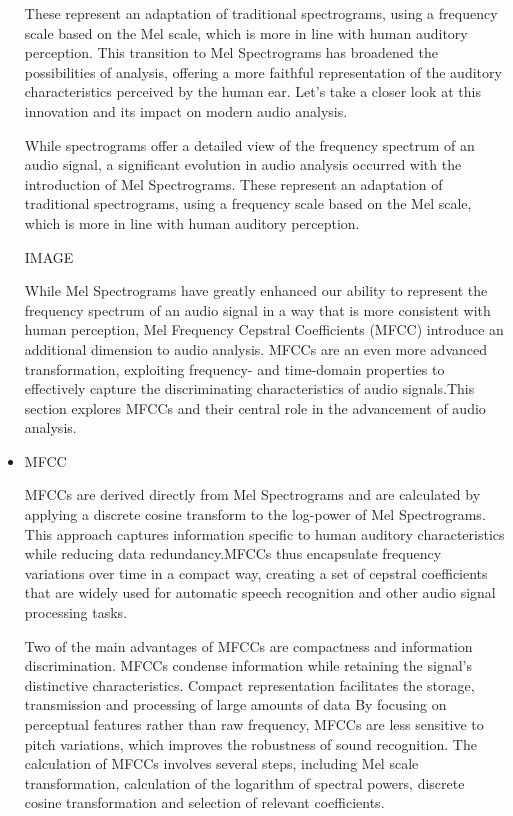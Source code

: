 \documentclass[11pt]{article}
\begin{document}
\begin{itemize}
These represent an adaptation of traditional spectrograms, using a frequency scale based on the Mel scale, which is more in line with human auditory perception. This transition to Mel Spectrograms has broadened the possibilities of analysis, offering a more faithful representation of the auditory characteristics perceived by the human ear. Let's take a closer look at this innovation and its impact on modern audio analysis.

While spectrograms offer a detailed view of the frequency spectrum of an audio signal, a significant evolution in audio analysis occurred with the introduction of Mel Spectrograms. These represent an adaptation of traditional spectrograms, using a frequency scale based on the Mel scale, which is more in line with human auditory perception.

IMAGE


While Mel Spectrograms have greatly enhanced our ability to represent the frequency spectrum of an audio signal in a way that is more consistent with human perception, Mel Frequency Cepstral Coefficients (MFCC) introduce an additional dimension to audio analysis. MFCCs are an even more advanced transformation, exploiting frequency- and time-domain properties to effectively capture the discriminating characteristics of audio signals.This section explores MFCCs and their central role in the advancement of audio analysis.


    \item MFCC

MFCCs are derived directly from Mel Spectrograms and are calculated by applying a discrete cosine transform to the log-power of Mel Spectrograms. This approach captures information specific to human auditory characteristics while reducing data redundancy.MFCCs thus encapsulate frequency variations over time in a compact way, creating a set of cepstral coefficients that are widely used for automatic speech recognition and other audio signal processing tasks.

Two of the main advantages of MFCCs are compactness and information discrimination. MFCCs condense information while retaining the signal's distinctive characteristics. Compact representation facilitates the storage, transmission and processing of large amounts of data
By focusing on perceptual features rather than raw frequency, MFCCs are less sensitive to pitch variations, which improves the robustness of sound recognition.
The calculation of MFCCs involves several steps, including Mel scale transformation, calculation of the logarithm of spectral powers, discrete cosine transformation and selection of relevant coefficients.




\end{itemize}
\end{document}
